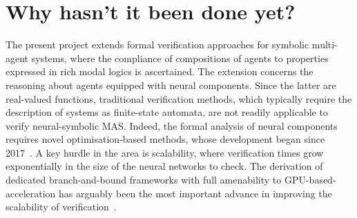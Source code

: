 \documentclass[11pt]{article}
\begin{document}



\section{Why hasn't it been done yet?}



The present project extends formal verification approaches
for symbolic multi-agent systems, where the compliance of
compositions of agents to properties expressed in rich modal
logics is ascertained. The extension concerns the reasoning
about agents equipped with neural components. Since the
latter are real-valued functions, traditional verification
methods, which typically require the description of systems
as finite-state automata, are not readily applicable to
verify neural-symbolic MAS. Indeed, the formal analysis of
neural components requires novel optimisation-based methods,
whose development began since 2017~\cite{Katz+17}. A key
hurdle in the area is scalability, where verification times
grow exponentially in the size of the neural networks to check. The
derivation of dedicated branch-and-bound frameworks with
full amenability to GPU-based-acceleration has arguably been the
most important advance in improving the scalability of
verification~\cite{Zhang+22a,Wang+21,FerrariMJV22}. 
\end{document}
